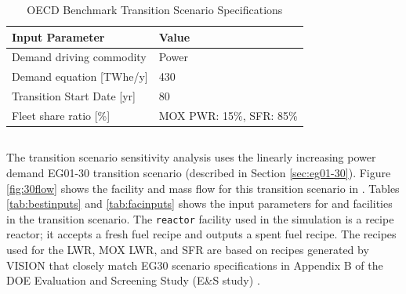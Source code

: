 \begin{table}[]
    \centering
    \doublespacing
    \caption{OECD Benchmark Transition Scenario
	Specifications \cite{oecd_nuclear_energy_agency_wpfc_nodate}}
	\label{tab:dymondinputs}
    \small
    \begin{tabular}{ll}
    \hline
                               \textbf{Input Parameter}            & \textbf{Value}            \\ \hline
    Demand driving commodity   & Power              \\
                               Demand equation {[}TWhe/y{]}   & 430        \\
                               Transition Start Date [yr] & 80\\ 
                               Fleet share ratio [\%] & \gls{MOX} \gls{PWR}: 15\%, \gls{SFR}: 85\%\\ \hline
    \end{tabular}%
    \end{table}

\subsection{\Cyclus}
The \Cyclus transition scenario sensitivity analysis uses 
the linearly increasing power demand EG01-30 transition scenario 
(described in Section \ref{sec:eg01-30}).  
Figure \ref{fig:30flow} shows the facility and mass flow 
for this transition scenario in \Cyclus. 
Tables \ref{tab:bestinputs} and \ref{tab:facinputs}
shows the input parameters for \deploy and facilities
in the transition scenario. 
The \texttt{reactor} facility used in the \Cyclus simulation 
is a recipe reactor; it accepts a fresh fuel recipe and outputs 
a spent fuel recipe. 
The recipes used for the \gls{LWR}, \gls{MOX} \gls{LWR}, and 
\gls{SFR} are based on recipes generated by VISION 
\cite{chee_arfc/transition-scenarios_2018}
that closely match EG30 scenario specifications in 
Appendix B of the \gls{DOE} Evaluation and Screening Study 
(E\&S study) \cite{wigeland_nuclear_2014}. 

